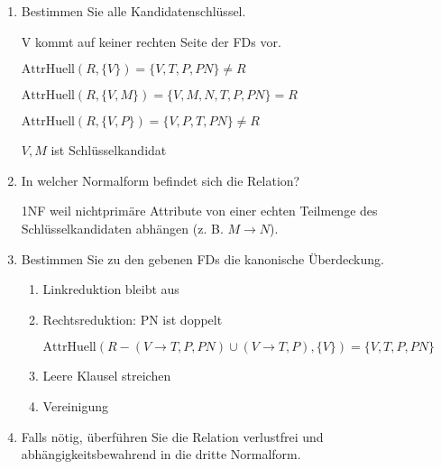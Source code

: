 \documentclass{lehramt-informatik-haupt}
\begin{document}
\begin{enumerate}
\item Bestimmen Sie alle Kandidatenschlüssel.

\begin{antwort}
V kommt auf keiner rechten Seite der FDs vor.

$\text{AttrHuell}(R, \{V\}) = \{V, T, P, PN\} \neq  R$

$\text{AttrHuell}(R, \{V, M\}) = \{V, M, N, T, P, PN\} = R$

$\text{AttrHuell}(R, \{V, P\}) = \{V, P, T, PN\} \neq R$

$V, M$ ist Schlüsselkandidat
\end{antwort}

\item In welcher Normalform befindet sich die Relation?

\begin{antwort}
1NF weil nichtprimäre Attribute von einer echten Teilmenge des
Schlüsselkandidaten abhängen (z. B. $M \rightarrow N$).
\end{antwort}

\item Bestimmen Sie zu den gebenen FDs die kanonische Überdeckung.

\begin{antwort}

\begin{enumerate}
\item Linkreduktion bleibt aus

\item Rechtsreduktion: PN ist doppelt

$\text{AttrHuell}(R - (V \rightarrow T, P, PN) \cup (V \rightarrow T, P), \{V\}) = \{V, T, P, PN\}$

\item Leere Klausel streichen

\item Vereinigung


\end{enumerate}

\end{antwort}

\item Falls nötig, überführen Sie die Relation verlustfrei und
abhängigkeitsbewahrend in die dritte Normalform.
\end{enumerate}

\literatur
\end{document}
